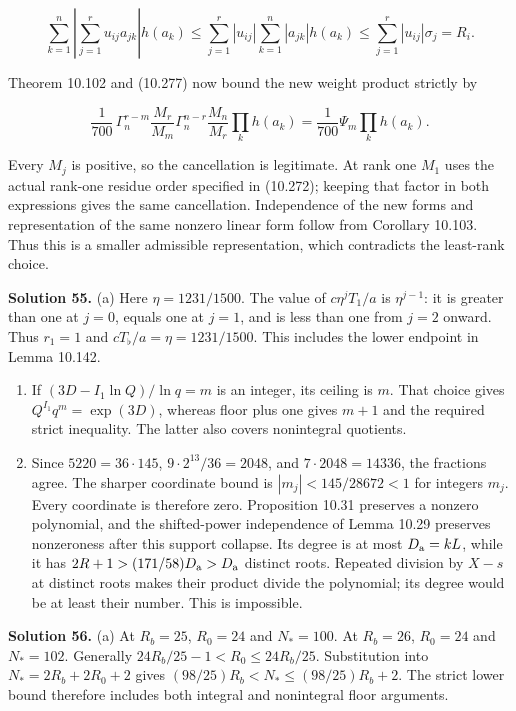 \documentclass[
  11pt,
  a4paper,
]{article}
\begin{document}
\[
\sum_{k=1}^n\left|\sum_{j=1}^ru_{ij}a_{jk}\right|h(a_k)
\le\sum_{j=1}^r|u_{ij}|\sum_{k=1}^n|a_{jk}|h(a_k)
\le\sum_{j=1}^r|u_{ij}|\sigma_j=R_i.
\]

Theorem 10.102 and (10.277) now bound the new weight product strictly by

\[
\frac1{700}\,
\Gamma_n^{r-m}\frac{M_r}{M_m}
\Gamma_n^{n-r}\frac{M_n}{M_r}\prod_kh(a_k)
=\frac1{700}\Psi_m\prod_kh(a_k).
\]

Every \(M_j\) is positive, so the cancellation is legitimate. At rank
one \(M_1\) uses the actual rank-one residue order specified in
(10.272); keeping that factor in both expressions gives the same
cancellation. Independence of the new forms and representation of the
same nonzero linear form follow from Corollary 10.103. Thus this is a
smaller admissible representation, which contradicts the least-rank
choice.

\textbf{Solution 55.} (a) Here \(\eta=1231/1500\). The value of
\(c\eta^jT_1/a\) is \(\eta^{j-1}\): it is greater than one at \(j=0\),
equals one at \(j=1\), and is less than one from \(j=2\) onward. Thus
\(r_1=1\) and \(cT_\flat/a=\eta=1231/1500\). This includes the lower
endpoint in Lemma 10.142.

\begin{enumerate}
\def\labelenumi{(\alph{enumi})}
\setcounter{enumi}{1}
\item
  If \((3D-I_1\ln Q)/\ln q=m\) is an integer, its ceiling is \(m\). That
  choice gives \(Q^{I_1}q^m=\exp(3D)\), whereas floor plus one gives
  \(m+1\) and the required strict inequality. The latter also covers
  nonintegral quotients.
\item
  Since \(5220=36\cdot145\), \(9\cdot2^{13}/36=2048\), and
  \(7\cdot2048=14336\), the fractions agree. The sharper coordinate
  bound is \(|m_j|<145/28672<1\) for integers \(m_j\). Every coordinate
  is therefore zero. Proposition 10.31 preserves a nonzero polynomial,
  and the shifted-power independence of Lemma 10.29 preserves
  nonzeroness after this support collapse. Its degree is at most
  \(D_{\rm a}=kL\), while it has \(2R+1>(171/58)D_{\rm a}>D_{\rm a}\)
  distinct roots. Repeated division by \(X-s\) at distinct roots makes
  their product divide the polynomial; its degree would be at least
  their number. This is impossible.
\end{enumerate}

\textbf{Solution 56.} (a) At \(R_b=25\), \(R_0=24\) and \(N_*=100\). At
\(R_b=26\), \(R_0=24\) and \(N_*=102\). Generally
\(24R_b/25-1<R_0\le24R_b/25\). Substitution into \(N_*=2R_b+2R_0+2\)
gives \((98/25)R_b<N_*\le(98/25)R_b+2\). The strict lower bound
therefore includes both integral and nonintegral floor arguments.
\end{document}
